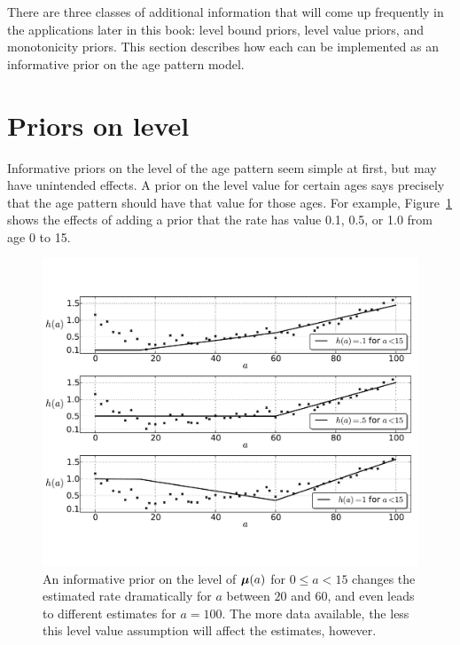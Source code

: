 There are three classes of additional information that will come up
frequently in the applications later in this book: level bound priors,
level value priors, and monotonicity priors. This section describes
how each can be implemented as an informative prior on the age pattern
model.


\section{Priors on level}

Informative priors on the level of the age pattern seem simple at
first, but may have unintended effects.  A prior on the level value
for certain ages says precisely that the age pattern should have that
value for those ages.  For example, Figure~\ref{level-value-priors} shows
the effects of adding a prior that the rate has value 0.1, 0.5, or 1.0
from age 0 to 15.


\begin{figure}[h]
\begin{center}
\includegraphics[width=\textwidth]{level_value-smoothing-splines.pdf}
\caption{An informative prior on the level of
$\boldsymbol{\mu}(a)$ for $0 \leq a < 15$ changes the estimated rate dramatically
for $a$ between $20$ and $60$, and even leads to different estimates
for $a = 100$.  The more data available, the less this level value
assumption will affect the estimates, however.
}
\label{level-value-priors}
\end{center}
\end{figure}



